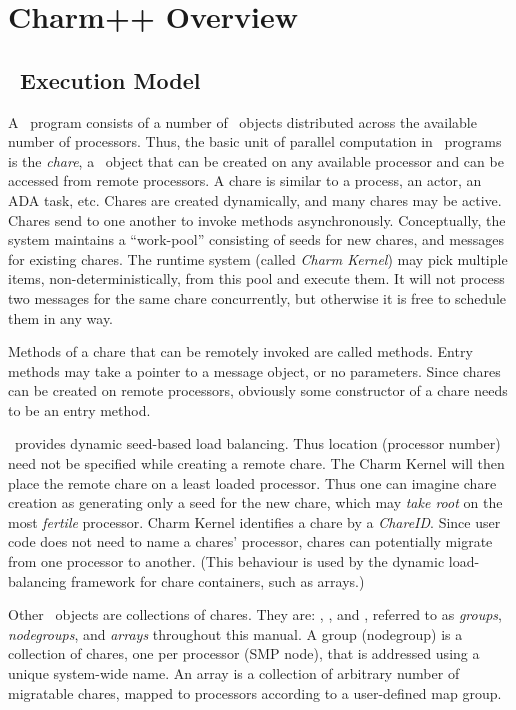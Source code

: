 \section{Charm++ Overview}

\subsection{\charmpp\ Execution Model}

A \charmpp\ program consists of a number of \charmpp\ objects distributed across
the available number of processors. Thus,
the basic unit of parallel computation in \charmpp\ programs is the
{\em chare}, a \charmpp\ object that can be
created on any available processor and can be accessed from remote processors.
A chare is similar to a
process, an actor, an ADA task, etc.  Chares 
are created dynamically, and many chares
may be active.  Chares send  to one another 
to invoke methods asynchronously.  Conceptually, the system maintains a
``work-pool'' consisting of seeds for new chares, and 
messages for
existing chares. The runtime system (called {\em Charm Kernel}) may pick 
multiple items,
non-deterministically, from this pool and execute them.  It will not
process two messages for the same chare concurrently, but 
otherwise it is free to schedule them in any way.

Methods of a chare that can be remotely invoked are called 
 methods.
Entry methods may take a pointer to a message object, or no parameters.
Since chares can be created on remote processors, obviously 
some constructor of a chare needs to be an entry method.

\charmpp\ provides dynamic seed-based load balancing. Thus location 
(processor number)
need not be specified while creating a remote chare. The Charm Kernel
will then place
the remote chare on a least loaded processor. Thus one can imagine chare 
creation as
generating only a seed for the new chare, which may {\em take root} on the most
{\em fertile} processor. Charm Kernel identifies a chare by a 
{\em ChareID}.
Since user code does not need to name a chares' processor, chares 
can potentially migrate from one processor to another.
(This behaviour is used by the dynamic load-balancing framework for 
chare containers, such as arrays.)

Other \charmpp\ objects are collections of chares. They are:
, , and
, referred to as {\em groups}, 
{\em nodegroups}, and
{\em arrays} throughout this manual. A group (nodegroup) is a collection of 
chares, one per processor (SMP node),
that is addressed using a unique system-wide name. An array is a collection 
of arbitrary
number of migratable chares, mapped to processors according to a user-defined 
map group.

